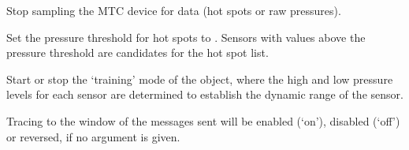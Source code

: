   Stop sampling the MTC device for data (hot spots or raw pressures).
  
  Set the pressure threshold for hot spots to .
  Sensors with values above the pressure threshold are candidates for the hot spot list.

  Start or stop the `training' mode of the  object, where the high and low pressure levels for each sensor are
  determined to establish the dynamic range of the sensor.

  Tracing to the \MaxName{} window of the messages sent will be enabled (`on'), disabled (`off') or reversed, if no argument is given.
  
  \objListCmdEnd

\objItemFile

\objItemMessage


